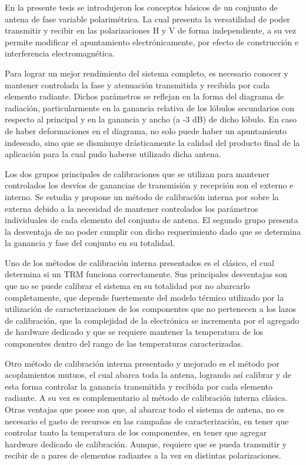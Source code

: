 En la presente tesis se introdujeron los conceptos básicos de un conjunto de antena de fase variable polarimétrica. La cual 
presenta la versatilidad de poder transmitir y recibir en las polarizaciones H y V de forma independiente, a su vez permite
modificar el apuntamiento electrónicamente, por efecto de construcción e interferencia electromagnética.

Para lograr un mejor rendimiento del sistema completo, es necesario conocer y mantener controlada la fase y atenuación
transmitida y recibida por cada elemento radiante. Dichos parámetros se reflejan en la forma del diagrama de radiación,
particularmente en la ganancia relativa de los lóbulos secundarios con respecto al principal y en la ganancia y ancho (a -3 dB)
de dicho lóbulo. En caso de haber deformaciones en el diagrama, no solo puede haber un apuntamiento indeseado, sino que se
disminuye drásticamente la calidad del producto final de la aplicación para la cual pudo haberse utilizado dicha antena.

Los dos grupos principales de calibraciones que se utilizan para mantener controlados los desvíos de ganancias de transmisión y
recepción son el externo e interno. Se estudia y propone un método de calibración interna por sobre la externa debido a la
necesidad de mantener controlados los parámetros individuales de cada elemento del conjunto de antena. El segundo grupo presenta
la desventaja de no poder cumplir con dicho requerimiento dado que se determina la ganancia y fase del conjunto en su totalidad. 

Uno de los métodos de calibración interna presentados es el clásico, el cual determina si un TRM funciona correctamente. 
Sus principales desventajas son que no se puede calibrar el sistema en su totalidad por no abarcarlo completamente, que depende
fuertemente del modelo térmico utilizado por la utilización de caracterizaciones de los componentes que no pertenecen a
los lazos de calibración, que la complejidad de la electrónica se incrementa por el agregado de hardware dedicado y que se
requiere mantener la temperatura de los componentes dentro del rango de las temperaturas caracterizadas.

Otro método de calibración interna presentado y mejorado es el método por acoplamientos mutuos, el cual abarca toda la
antena, logrando así calibrar y de esta forma controlar la ganancia transmitida y recibida por cada elemento radiante. A su
vez es complementario al método de calibración interna clásica. Otras ventajas que posee son que, al abarcar todo el sistema de
antena, no es necesario el gasto de recursos en las campañas de caracterización, en tener que controlar tanto la temperatura de
los componentes, en tener que agregar hardware dedicado de calibración. Aunque, requiere que se pueda transmitir y recibir de a
pares de elementos radiantes a la vez en distintas polarizaciones. 


